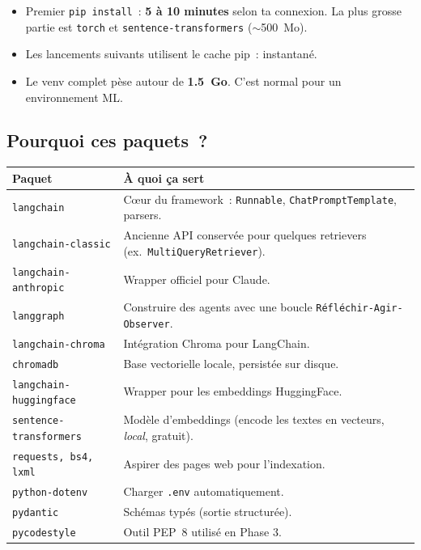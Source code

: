 \documentclass[11pt,a4paper]{article}
\begin{document}
\begin{tcolorbox}[title=Combien de temps~? Combien de Mo~?]
\begin{itemize}[leftmargin=*]
  \item Premier \texttt{pip install}~: \textbf{5 à 10 minutes} selon
        ta connexion. La plus grosse partie est \texttt{torch} et
        \texttt{sentence-transformers} (\(\sim\)500~Mo).
  \item Les lancements suivants utilisent le cache pip~: instantané.
  \item Le venv complet pèse autour de \textbf{1.5~Go}. C'est
        normal pour un environnement ML.
\end{itemize}
\end{tcolorbox}

\subsection{Pourquoi ces paquets~?}

\begin{center}
\begin{tabular}{p{5cm} p{10.5cm}}
\toprule
\textbf{Paquet} & \textbf{À quoi ça sert} \\
\midrule
\texttt{langchain}              & Cœur du framework~: \texttt{Runnable},
                                  \texttt{ChatPromptTemplate}, parsers. \\
\texttt{langchain-classic}      & Ancienne API conservée pour quelques
                                  retrievers (ex.~\texttt{MultiQueryRetriever}). \\
\texttt{langchain-anthropic}    & Wrapper officiel pour Claude. \\
\texttt{langgraph}              & Construire des agents avec une boucle
                                  \texttt{Réfléchir-Agir-Observer}. \\
\texttt{langchain-chroma}       & Intégration Chroma pour LangChain. \\
\texttt{chromadb}               & Base vectorielle locale, persistée sur
                                  disque. \\
\texttt{langchain-huggingface}  & Wrapper pour les embeddings HuggingFace. \\
\texttt{sentence-transformers}  & Modèle d'embeddings (encode les textes
                                  en vecteurs, \emph{local}, gratuit). \\
\texttt{requests, bs4, lxml}    & Aspirer des pages web pour l'indexation. \\
\texttt{python-dotenv}          & Charger \texttt{.env} automatiquement. \\
\texttt{pydantic}               & Schémas typés (sortie structurée). \\
\texttt{pycodestyle}            & Outil PEP~8 utilisé en Phase 3. \\
\bottomrule
\end{tabular}
\end{center}
\end{document}
